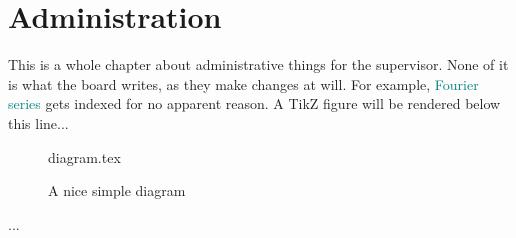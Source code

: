 \documentclass[float=false, crop=false]{standalone}
\begin{document}
\chapter{Administration}
This is a whole chapter about administrative things for the supervisor. None of it is what the board writes, as they make changes at will. For example, \textcolor{teal}{Fourier series}
 gets indexed for no apparent reason.
A TikZ 
 figure will be rendered below this line...
 
\begin{figure}[ht]
 
{diagram.tex}
 
\label{fig:tikzexample}
\caption{A nice simple diagram}
\end{figure}
 
...
\end{document}

